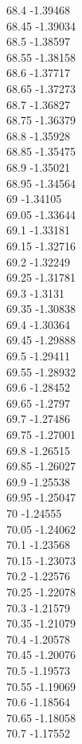 {68.4	-1.39468\\
68.45	-1.39034\\
68.5	-1.38597\\
68.55	-1.38158\\
68.6	-1.37717\\
68.65	-1.37273\\
68.7	-1.36827\\
68.75	-1.36379\\
68.8	-1.35928\\
68.85	-1.35475\\
68.9	-1.35021\\
68.95	-1.34564\\
69	-1.34105\\
69.05	-1.33644\\
69.1	-1.33181\\
69.15	-1.32716\\
69.2	-1.32249\\
69.25	-1.31781\\
69.3	-1.3131\\
69.35	-1.30838\\
69.4	-1.30364\\
69.45	-1.29888\\
69.5	-1.29411\\
69.55	-1.28932\\
69.6	-1.28452\\
69.65	-1.2797\\
69.7	-1.27486\\
69.75	-1.27001\\
69.8	-1.26515\\
69.85	-1.26027\\
69.9	-1.25538\\
69.95	-1.25047\\
70	-1.24555\\
70.05	-1.24062\\
70.1	-1.23568\\
70.15	-1.23073\\
70.2	-1.22576\\
70.25	-1.22078\\
70.3	-1.21579\\
70.35	-1.21079\\
70.4	-1.20578\\
70.45	-1.20076\\
70.5	-1.19573\\
70.55	-1.19069\\
70.6	-1.18564\\
70.65	-1.18058\\
70.7	-1.17552\\
}
